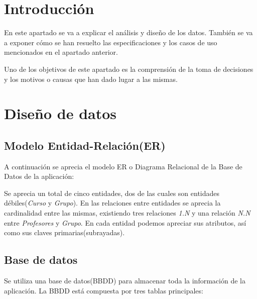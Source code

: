 
\section{Introducción}
En este apartado se va a explicar el análisis y diseño de los datos. También se va a exponer cómo se han resuelto las especificaciones y los casos de uso mencionados en el apartado anterior.  

Uno de los objetivos de este apartado es la comprensión  de la toma de decisiones y los motivos o causas que han dado lugar a las mismas.

\section{Diseño de datos}


\subsection{Modelo Entidad-Relación(ER)}
A continuación se aprecia el modelo ER o Diagrama Relacional de la Base de Datos de la aplicación:


Se aprecia un total de cinco entidades, dos de las cuales son entidades débiles(\emph{Curso} y \emph{Grupo}). En las relaciones entre entidades se aprecia la cardinalidad entre las mismas, existiendo tres relaciones \emph{1.N} y una relación \emph{N.N} entre \emph{Profesores} y \emph{Grupo}. En cada entidad podemos apreciar sus atributos, así como sus claves primarias(subrayadas).

\newpage

\subsection{Base de datos}
Se utiliza una base de datos(BBDD) para almacenar toda la información de la aplicación. La BBDD está compuesta por tres tablas principales:

